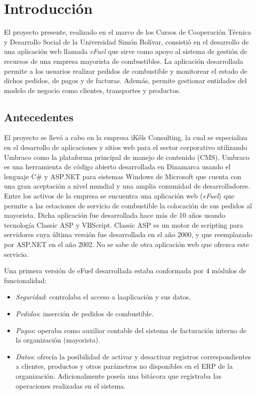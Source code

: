 \chapter*{Introducción}

El proyecto presente, realizado en el marco de los Cursos de Cooperación Técnica y Desarrollo Social de la Universidad Simón Bolívar, consistió en el desarrollo de una aplicación web llamada \emph{eFuel} que sirve como apoyo al sistema de gestión de recursos de una empresa mayorista de combustibles. La aplicación desarrollada permite a los usuarios realizar pedidos de combustible y monitorear el estado de dichos pedidos, de pagos y de facturas. Además, permite gestionar entidades del modelo de negocio como clientes, transportes y productos.

\section*{Antecedentes}
El proyecto se llevó a cabo en la empresa iKêls Consulting, la cual se especializa en el desarrollo de aplicaciones y sitios web para el sector corporativo utilizando Umbraco como la plataforma principal de manejo de  contenido (CMS). Umbraco es una herramienta de código abierto desarrollada en Dinamarca usando el lenguaje C\# y ASP.NET para sistemas Windows de Microsoft que cuenta con una gran aceptación a nivel mundial y una amplia comunidad de desarrolladores. Entre los activos de la empresa se encuentra una aplicación web (\emph{eFuel}) que permite a las estaciones de servicio de combustible la colocación de sus pedidos al mayorista. Dicha aplicación fue desarrollada hace más de 10 años usando tecnología Classic ASP y VBScript. Classic ASP es un motor de scripting para servidores cuya última versión fue desarrollada en el año 2000, y que reemplazado por ASP.NET en el año 2002. No se sabe de otra aplicación web que ofrezca este servicio.

Una primera versión de eFuel desarrollada estaba conformada por 4 módulos de funcionalidad:

\begin{itemize}
    \item \emph{Seguridad}: controlaba el acceso a laaplicación y sus datos.
    \item \emph{Pedidos}: inserción de pedidos de combustible.
    \item \emph{Pagos}: operaba como auxiliar contable del sistema de facturación interno de la organización (mayorista). 
    \item \emph{Datos}: ofrecía la posibilidad de activar y desactivar registros correspondientes a clientes, productos y otros parámetros no disponibles en el ERP de la organización. Adicionalmente poseía una bitácora que registraba las operaciones realizadas en el sistema.
\end{itemize}

